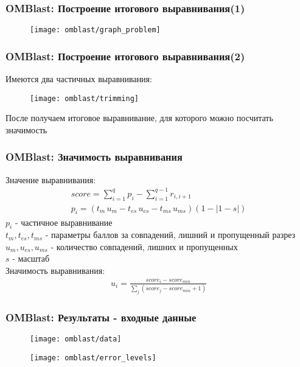 \begin{frame}
\frametitle{OMBlast: Построение итогового выравнивания(1)}
\begin{figure}
  \centering
  \texttt{[image: omblast/graph\_problem]}
\end{figure}

\end{frame}

\begin{frame}
\frametitle{OMBlast: Построение итогового выравнивания(2)}
Имеются два частичных выравнивания:
\begin{figure}
  \centering
  \texttt{[image: omblast/trimming]}
\end{figure}
После получаем итоговое выравнивание, для которого можно посчитать значимость
\end{frame}

\begin{frame}
\frametitle{OMBlast: Значимость выравнивания}
Значение выравнивания:
\begin{gather*}
  score = \sum\limits_{i=1}^q p_i - \sum\limits_{i=1}^{q - 1} r_{i,i+1} \\
  p_i = (t_m \, u_m - t_{es} \, u_{es} - t_{ms} \, u_{ms}) (1 - |1 - s|)
\end{gather*}
$p_i$ - частичное выравнивание \\
$t_m, t_{es}, t_{ms}$ - параметры баллов за совпадений, лишний и пропущенный разрез \\
$u_m, u_{es}, u_{ms}$ - количество совпадений, лишних и пропущенных \\
$s$ - масштаб \\
Значимость выравнивания:
\begin{gather*}
  u_i = \frac{score_i - score_{min}}{\sum\limits_{j} (score_j - score _{min} + 1)}
\end{gather*}
\end{frame}

\begin{frame}
\frametitle{OMBlast: Результаты - входные данные}
  \begin{figure}
    \centering
    \texttt{[image: omblast/data]}
  \end{figure}
  \begin{figure}
    \centering
    \texttt{[image: omblast/error\_levels]}
  \end{figure}
\end{frame}

